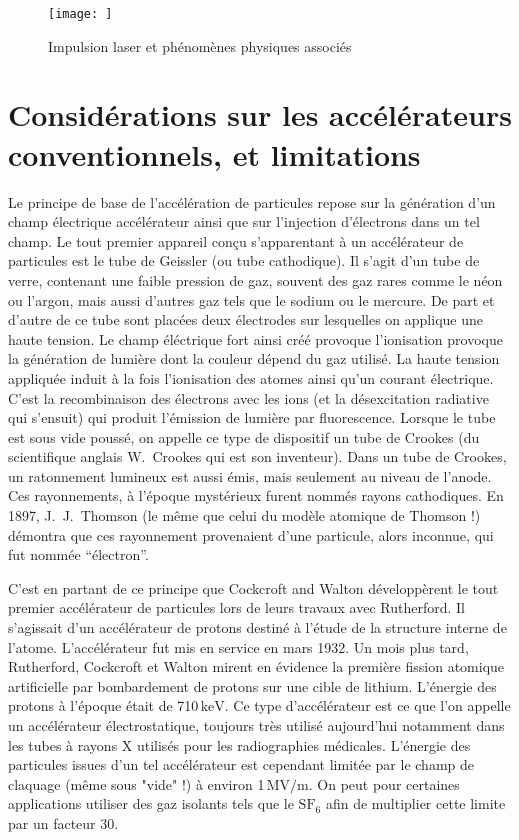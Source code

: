 \documentclass[a4paper]{book}
\begin{document}
\begin{figure}[!htbp]
\begin{center}
\texttt{[image: ]}
\end{center}
\caption{Impulsion laser et phénomènes physiques associés}
\label{fig:laser_matiere}
\end{figure}

\section{Considérations sur les accélérateurs conventionnels, et limitations}

Le principe de base de l'accélération de particules repose sur la génération d'un champ électrique accélérateur ainsi que sur l'injection d'électrons dans un tel champ. Le tout premier appareil conçu s'apparentant à un accélérateur de particules est le tube de Geissler (ou tube cathodique). Il s'agit d'un tube de verre, contenant une faible pression de gaz, souvent des gaz rares comme le néon ou l'argon, mais aussi d'autres gaz tels que le sodium ou le mercure. De part et d'autre de ce tube sont placées deux électrodes sur lesquelles on applique une haute tension. Le champ éléctrique fort ainsi créé provoque l'ionisation provoque la génération de lumière dont la couleur dépend du gaz utilisé. La haute tension appliquée induit à la fois l'ionisation des atomes ainsi qu'un courant électrique. C'est la recombinaison des électrons avec les ions (et la désexcitation radiative qui s'ensuit) qui produit l'émission de lumière par fluorescence. Lorsque le tube est sous vide poussé, on appelle ce type de dispositif un tube de Crookes (du scientifique anglais W.~Crookes qui est son inventeur). Dans un tube de Crookes, un ratonnement lumineux est aussi émis, mais seulement au niveau de l'anode. Ces rayonnements, à l'époque mystérieux furent nommés rayons cathodiques. En 1897, J.~J.~Thomson (le même que celui du modèle atomique de Thomson !) démontra que ces rayonnement provenaient d'une particule, alors inconnue, qui fut nommée ``électron''. 

C'est en partant de ce principe que Cockcroft and Walton développèrent le tout premier accélérateur de particules lors de leurs travaux avec Rutherford. Il s'agissait d'un accélérateur de protons destiné à l'étude de la structure interne de l'atome. L'accélérateur fut mis en service en mars 1932. Un mois plus tard, Rutherford, Cockcroft et Walton mirent en évidence la première fission atomique artificielle par bombardement de protons sur une cible de lithium. L'énergie des protons à l'époque était de 710$\,\mathrm{keV}$. Ce type d'accélérateur est ce que l'on appelle un accélérateur électrostatique, toujours très utilisé aujourd'hui notamment dans les tubes à rayons X utilisés pour les radiographies médicales. L'énergie des particules issues d'un tel accélérateur est cependant limitée par le champ de claquage (même sous "vide" !) à environ 1$\,\mathrm{MV/m}$. On peut pour certaines applications utiliser des gaz isolants tels que le $\mathrm{SF}_6$ afin de multiplier cette limite par un facteur 30.
\end{document}
